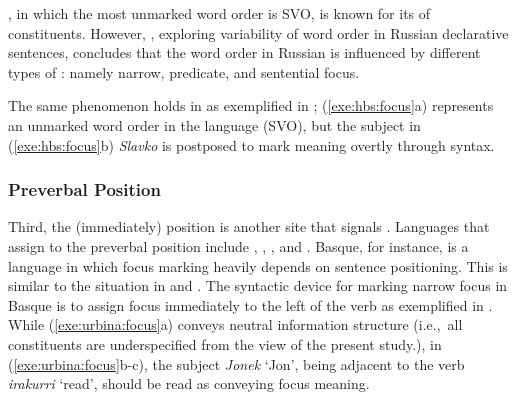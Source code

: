 \noindent {}, in which the most unmarked word order is SVO,
is known for its  of constituents.  However,
\citet{rodionova:01}, exploring variability of word order in Russian
declarative sentences, concludes that the word order in Russian is
influenced by different types of : namely narrow, predicate, and
sentential focus.


The same phenomenon holds in  as
exemplified in ; (\ref{exe:hbs:focus}a)
represents an unmarked word order in the language (SVO), but the
subject in (\ref{exe:hbs:focus}b) \textit{Slavko} is postposed to mark
 meaning overtly through syntax.







\subsubsection{Preverbal Position}
\label{4:sssec:preverbal}

Third, the (immediately)  position is another site that
signals . Languages that assign  to the preverbal
position include  \citep{urbina:99}, 
\citep{kiss:98,szendroi:01},  \citep{icssever:03}, and
\citep{comrie:84,tamrazian:91,tamrazian:94,tragut:09,megerdoomian:11}.
Basque, for instance, is a language in which focus marking heavily
depends on sentence positioning. This is similar to the situation in
 \citep{vallduvi:92,engdahl:vallduvi:96} and  \citep{kugler:etal:07}. The syntactic device for marking
narrow focus in Basque is to assign focus immediately to the left of
the verb as exemplified in . While
(\ref{exe:urbina:focus}a) conveys neutral information structure
(i.e.,\ all constituents are underspecified from the view of the
present study.), in (\ref{exe:urbina:focus}b-c), the subject
\textit{Jonek} `Jon', being adjacent to the verb \textit{irakurri}
`read', should be read as conveying focus meaning.


